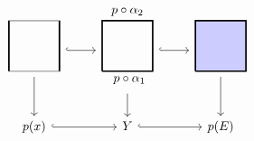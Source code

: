 \begin{center}
    \(
    \begin{tikzcd}
    \begin{tikzpicture}[x=4em, y=4em, baseline=1.4em]
        \draw[very thick, black!30] (0,0)--(1,0)--(1,1)--(0,1)--(0,0);
        \draw[very thick]
        (0,0)--(0,1) (1,0)--(1,1);
    \end{tikzpicture}
    \ar[r, hook]\ar[d]
    & 
    \begin{tikzpicture}[x=4em, y=4em, baseline=1.4em]
        \draw[very thick] (0,0)--(1,0)--(1,1)--(0,1)--(0,0);
        \filldraw 
            (0.54,0) node[anchor=north]{$p\circ\alpha_1$}
            (0.5,1) node[anchor=south]{$p\circ\alpha_2$};
    \end{tikzpicture} 
    \ar[r, hook]\ar[d]
    &
    \begin{tikzpicture}[x=4em, y=4em, baseline=1.4em]
        \filldraw[very thick, fill=blue!20] (0,0)--(1,0)--(1,1)--(0,1)--(0,0);
    \end{tikzpicture}
    \ar[d]\\
    p(x)\ar[r, hook]&Y\ar[r, hook]& p(E)
    \end{tikzcd}
    \)
\end{center}